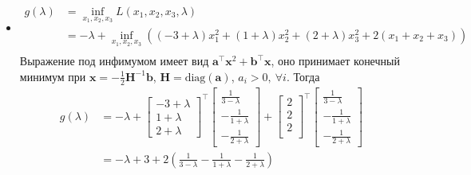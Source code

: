 \documentclass{article}
\begin{document}
\begin{enumerate}
\begin{itemize}
		      \item[(c)]
			      \begin{equation*}
				      \begin{aligned}
					      g(\lambda) & = \inf_{x_1, x_2, x_3} L(x_1, x_2, x_3, \lambda)                                                                                   \\
					                 & =-\lambda + \inf_{x_1, x_2, x_3} \left( (-3 + \lambda)x_1^2 + (1 + \lambda)x_2^2 + (2 + \lambda)x_3^2 + 2(x_1 + x_2 + x_3) \right) \\
				      \end{aligned}
			      \end{equation*}
			      Выражение под инфимумом имеет вид
			      $\mathbf{a}^\top \mathbf{x}^2 +
				      \mathbf{b}^\top\mathbf{x}$,
			      оно принимает конечный минимум при
			      $\mathbf{x} = -\frac{1}{2}
				      \mathbf{H}^{-1} \mathbf{b}$,
			      $\mathbf{H} = \mathrm{diag}(\mathbf{a})$,
			      $a_i > 0, \ \forall i$.
			      Тогда
			      \begin{align*}
				      g(\lambda) & = -\lambda +
				      \begin{bmatrix}
					      -3 + \lambda \\
					      1 + \lambda  \\
					      2 + \lambda
				      \end{bmatrix}^\top
				      \begin{bmatrix}
					      \frac{1}{3 - \lambda}  \\
					      -\frac{1}{1 + \lambda} \\
					      -\frac{1}{2 + \lambda}
				      \end{bmatrix} +
				      \begin{bmatrix}
					      2 \\
					      2 \\
					      2 \\
				      \end{bmatrix}^\top
				      \begin{bmatrix}
					      \frac{1}{3 - \lambda}  \\
					      -\frac{1}{1 + \lambda} \\
					      -\frac{1}{2 + \lambda}
				      \end{bmatrix}                 \\
				                 & = -\lambda + 3 + 2 \left(
				      \frac{1}{3 - \lambda} -
				      \frac{1}{1 + \lambda} -
				      \frac{1}{2 + \lambda} \right)

\end{align*}
\end{itemize}
\end{enumerate}
\end{document}
